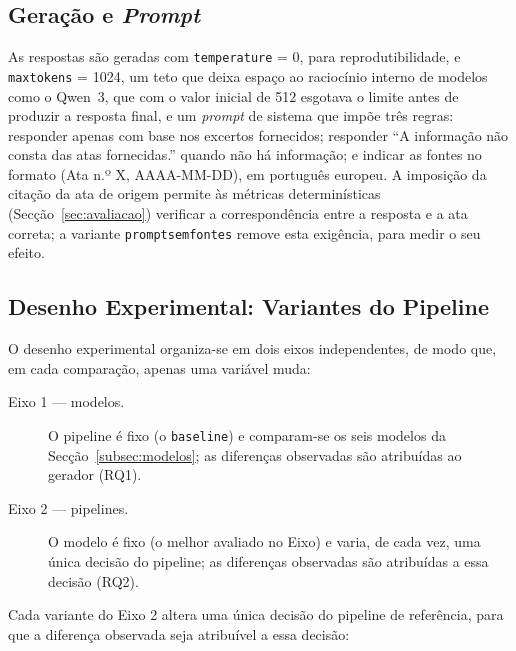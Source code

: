 \documentclass[11pt]{article}
\renewcommand{\_}{\textunderscore\allowbreak}
\begin{document}
\subsection{Geração e \textit{Prompt}}

As respostas são geradas com \texttt{temperature} = 0, para reprodutibilidade, e \texttt{max\_tokens} = 1024, um teto que deixa espaço ao raciocínio interno de modelos como o Qwen~3, que com o valor inicial de 512 esgotava o limite antes de produzir a resposta final, e um \textit{prompt} de sistema que impõe três regras: responder apenas com base nos excertos fornecidos; responder ``A informação não consta das atas fornecidas.'' quando não há informação; e indicar as fontes no formato (Ata n.º X, AAAA-MM-DD), em português europeu. A imposição da citação da ata de origem permite às métricas determinísticas (Secção~\ref{sec:avaliacao}) verificar a correspondência entre a resposta e a ata correta; a variante \texttt{prompt\_sem\_fontes} remove esta exigência, para medir o seu efeito.

\subsection{Desenho Experimental: Variantes do Pipeline}
\label{subsec:variantes}

O desenho experimental organiza-se em dois eixos independentes, de modo que, em cada comparação, apenas uma variável muda:

\begin{description}
    \item[Eixo 1 --- modelos.] O pipeline é fixo (o \texttt{baseline}) e comparam-se os seis modelos da Secção~\ref{subsec:modelos}; as diferenças observadas são atribuídas ao gerador (RQ1).
    \item[Eixo 2 --- pipelines.] O modelo é fixo (o melhor avaliado no Eixo) e varia, de cada vez, uma única decisão do pipeline; as diferenças observadas são atribuídas a essa decisão (RQ2).
\end{description}

Cada variante do Eixo 2 altera uma única decisão do pipeline de referência, para que a diferença observada seja atribuível a essa decisão:
\end{document}
